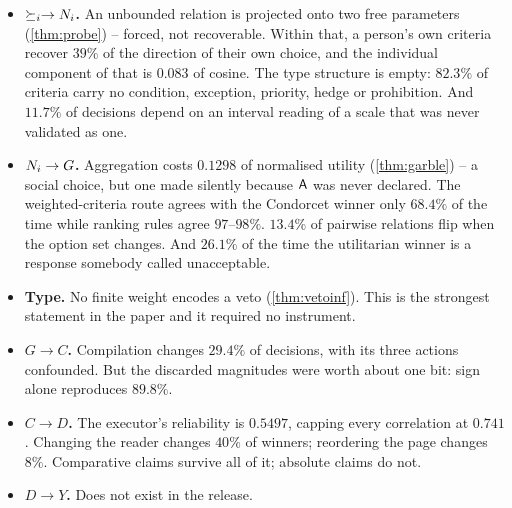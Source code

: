 \begin{itemize}
\item \textbf{$\succeq_i \to N_i$.} An unbounded relation is projected onto two
      free parameters (\cref{thm:probe}) -- forced, not recoverable. Within that,
      a person's own criteria recover $39\%$ of the direction of their own choice,
      and the individual component of that is $0.083$ of cosine. The type
      structure is empty: $82.3\%$ of criteria carry no condition, exception,
      priority, hedge or prohibition. And $11.7\%$ of decisions depend on an
      interval reading of a scale that was never validated as one.
\item \textbf{$N_i \to G$.} Aggregation costs $0.1298$ of normalised utility
      (\cref{thm:garble}) -- a social choice, but one made silently because
      $\mathsf{A}$ was never declared. The weighted-criteria route agrees with the
      Condorcet winner only $68.4\%$ of the time while ranking rules agree
      $97$--$98\%$. $13.4\%$ of pairwise relations flip when the option set
      changes. And $26.1\%$ of the time the utilitarian winner is a response
      somebody called unacceptable.
\item \textbf{Type.} No finite weight encodes a veto (\cref{thm:vetoinf}). This
      is the strongest statement in the paper and it required no instrument.
\item \textbf{$G \to C$.} Compilation changes $29.4\%$ of decisions, with its
      three actions confounded. But the discarded magnitudes were worth about one
      bit: sign alone reproduces $89.8\%$.
\item \textbf{$C \to D$.} The executor's reliability is $0.5497$, capping every
      correlation at $0.741$. Changing the reader changes $40\%$ of winners;
      reordering the page changes $8\%$. Comparative claims survive all of it;
      absolute claims do not.
\item \textbf{$D \to Y$.} Does not exist in the release.
\end{itemize}


